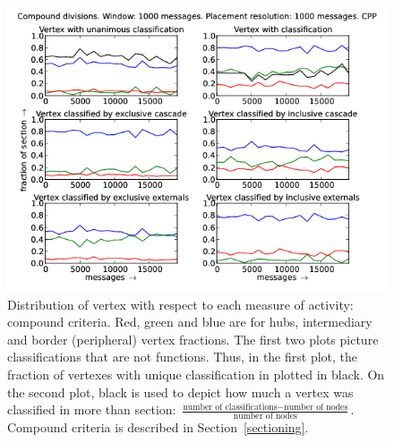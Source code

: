 \documentclass[%
 aip,
 jmp,%
 amsmath,amssymb,
 reprint,%
]{revtex4-1}
\begin{document}
\begin{figure}[hbtp] 
   \centering
        \includegraphics[width=\textwidth]{figs/CPP/1000_2}
    \caption{Distribution of vertex with respect to each measure of activity: compound criteria. Red, green and blue are for hubs, intermediary and border (peripheral) vertex fractions. The first two plots picture classifications that are not functions. Thus, in the first plot, the fraction of vertexes with unique classification in plotted in black. On the second plot, black is used to depict how much a vertex was classified in more than section: $\frac{\text{number of classifications} - \text{number of nodes}}{\text{number of nodes}}$. Compound criteria is described in Section~\ref{sectioning}.}
    \label{fig:cpp1000_}
\end{figure}
\end{document}
